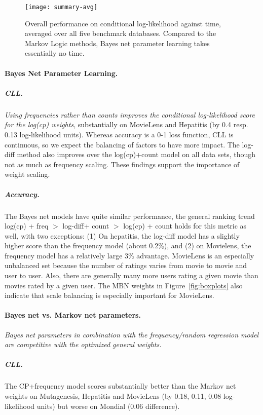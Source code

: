 \documentclass[twoside,leqno,twocolumn]{article}
\begin{document}
\begin{figure}[htbp]
\begin{center}
\texttt{[image: summary-avg]}
\caption{Overall performance on conditional log-likelihood against time, averaged over all five benchmark databases. Compared to the Markov Logic methods, Bayes net parameter learning takes essentially no time. \label{fig:summarize}}
\end{center}
\end{figure}

\paragraph{Bayes Net Parameter Learning.}
\subparagraph{CLL.} {\em Using frequencies rather than counts improves the conditional log-likelihood score for the log(cp) weights}, substantially on MovieLens and Hepatitis (by 0.4 resp. 0.13 log-likelihood units). Whereas accuracy is a 0-1 loss function, CLL is continuous, so we expect the balancing of factors to have more impact. The log-diff method also improves over the log(cp)+count model on all data sets, though not as much as frequency scaling. These findings support the importance of weight scaling. 

\subparagraph{Accuracy.}  The Bayes net models have quite similar performance, the general ranking trend  log(cp) + freq $>$ log-diff+ count $>$ log(cp) + count holds for this metric as well, with two exceptions: (1) On hepatitis, the log-diff model has a slightly higher score than the frequency model (about 0.2\%), and (2) on Movielens, the frequency model has a relatively large 3\% advantage. MovieLens is an especially unbalanced set because the number of ratings varies from movie to movie and user to user.  %
Also, there are generally many more users rating a given movie than movies rated by a given user. The MBN weights in Figure~\ref{fig:boxplots} also indicate that scale balancing is especially important for MovieLens.

\paragraph{Bayes net vs. Markov net parameters.} 
{\em Bayes net parameters in combination with the frequency/random regression model are competitive with the optimized general weights.} 
 
\subparagraph{CLL.}
The CP+frequency  model scores substantially better than the Markov net weights on Mutagenesis, Hepatitis and MovieLens (by 0.18, 0.11, 0.08 log-likelihood units) but worse on Mondial (0.06 difference). 
\end{document}
